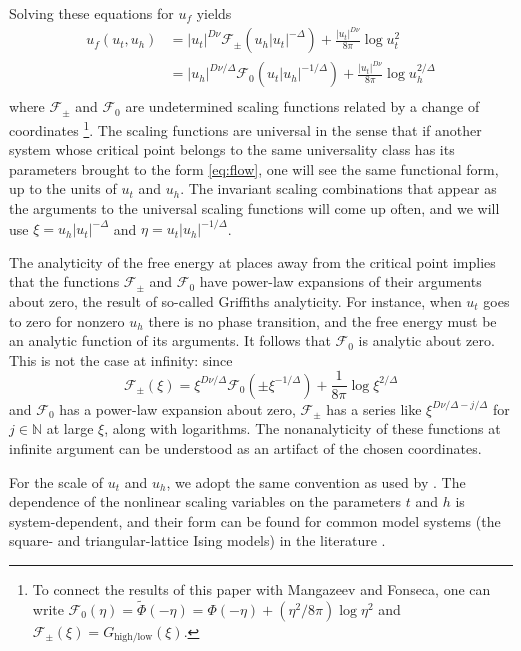 \documentclass[
aps,
pre,
preprint,
longbibliography,
floatfix
]{revtex4-2}
\begin{document}
Solving these equations for $u_f$ yields
\begin{equation}
  \begin{aligned}
    u_f(u_t, u_h)
    &=|u_t|^{D\nu}\mathcal F_\pm(u_h|u_t|^{-\Delta})+\frac{|u_t|^{D\nu}}{8\pi}\log u_t^2 \\
    &=|u_h|^{D\nu/\Delta}\mathcal F_0(u_t|u_h|^{-1/\Delta})+\frac{|u_t|^{D\nu}}{8\pi}\log u_h^{2/\Delta} \\
  \end{aligned}
\end{equation}
where $\mathcal F_\pm$ and $\mathcal F_0$ are undetermined scaling functions
related by a change of coordinates \footnote{To connect the results of this
  paper with Mangazeev and Fonseca, one can write $\mathcal
  F_0(\eta)=\tilde\Phi(-\eta)=\Phi(-\eta)+(\eta^2/8\pi) \log \eta^2$ and
$\mathcal F_\pm(\xi)=G_{\mathrm{high}/\mathrm{low}}(\xi)$.}.  The scaling
functions are universal in the sense that if another system whose critical
point belongs to the same universality class has its parameters brought to the
form \eqref{eq:flow}, one will see the same functional form, up to the units of
$u_t$ and $u_h$. The invariant scaling combinations that appear as the
arguments to the universal scaling functions will come up often, and we will
use $\xi=u_h|u_t|^{-\Delta}$ and $\eta=u_t|u_h|^{-1/\Delta}$.

The analyticity of the free energy at places away from the critical point
implies that the functions $\mathcal F_\pm$ and $\mathcal F_0$ have power-law
expansions of their arguments about zero, the result of so-called Griffiths
analyticity. For instance, when $u_t$ goes to zero for nonzero $u_h$ there is
no phase transition, and the free energy must be an analytic function of its
arguments. It follows that $\mathcal F_0$ is analytic about zero. This is not
the case at infinity: since
\begin{equation}
  \mathcal F_\pm(\xi)
  =\xi^{D\nu/\Delta}\mathcal F_0(\pm \xi^{-1/\Delta})+\frac1{8\pi}\log\xi^{2/\Delta}
\end{equation}
and $\mathcal F_0$ has a power-law expansion about zero, $\mathcal F_\pm$ has a
series like $\xi^{D\nu/\Delta-j/\Delta}$ for $j\in\mathbb N$ at large $\xi$,
along with logarithms. The nonanalyticity of these functions at infinite
argument can be understood as an artifact of the chosen coordinates.

For the scale of $u_t$ and $u_h$, we adopt the same convention as used by
\cite{Fonseca_2003_Ising}. The dependence of the nonlinear scaling variables on
the parameters $t$ and $h$ is system-dependent, and their form can be found for
common model systems (the square- and triangular-lattice Ising models) in the
literature \cite{Mangazeev_2010_Scaling, Clement_2019_Respect}.
\end{document}
